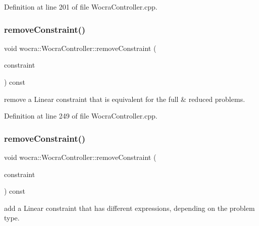 Definition at line 201 of file Wocra\+Controller.\+cpp.

\hypertarget{classwocra_1_1WocraController_ac1234e8084fedc0ed39e2ee97a40a31c}{}\label{classwocra_1_1WocraController_ac1234e8084fedc0ed39e2ee97a40a31c} 
\subsubsection{\texorpdfstring{remove\+Constraint()}{removeConstraint()}\hspace{0.1cm}{\footnotesize\ttfamily [1/2]}}
{\footnotesize\ttfamily void wocra\+::\+Wocra\+Controller\+::remove\+Constraint (\begin{DoxyParamCaption}\item[{\hyperlink{namespaceocra_ae8b87cf4099be3efc3b410019ad2046e}{ocra\+::\+Linear\+Constraint} \&}]{constraint }\end{DoxyParamCaption}) const}

remove a Linear constraint that is equivalent for the full \& reduced problems. 

Definition at line 249 of file Wocra\+Controller.\+cpp.

\hypertarget{classwocra_1_1WocraController_a9a1b55fe0392b1514a813d4f9ed413b2}{}\label{classwocra_1_1WocraController_a9a1b55fe0392b1514a813d4f9ed413b2} 
\subsubsection{\texorpdfstring{remove\+Constraint()}{removeConstraint()}\hspace{0.1cm}{\footnotesize\ttfamily [2/2]}}
{\footnotesize\ttfamily void wocra\+::\+Wocra\+Controller\+::remove\+Constraint (\begin{DoxyParamCaption}\item[{\hyperlink{classocra_1_1ControlConstraint}{ocra\+::\+Control\+Constraint} \&}]{constraint }\end{DoxyParamCaption}) const}

add a Linear constraint that has different expressions, depending on the problem type.

